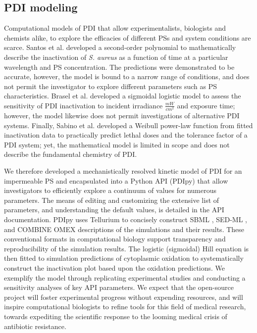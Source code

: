 \subsection{PDI modeling}
Computational models of PDI that allow experimentalists, biologists and chemists alike, to explore the efficacies of different PSs and system conditions are scarce. Santos et al. \cite{Santos2020ApplicationAureus} developed a second-order polynomial to mathematically describe the inactivation of \textit{S. aureus} as a function of time at a particular wavelength and PS concentration. The predictions were demonstrated to be accurate, however, the model is bound to a narrow range of conditions, and does not permit the investigator to explore different parameters such as PS characteristics. Brasel et al. \cite{Brasel2020AnAgalactiae} developed a sigmoidal logistic model to assess the sensitivity of PDI inactivation to incident irradiance $\frac{mW}{cm^2}$ and exposure time; however, the model likewise does not permit investigations of alternative PDI systems. Finally, Sabino et al. \cite{Sabino2019InactivationTherapy} developed a Weibull power-law function from fitted inactivation data to practically predict lethal doses and the tolerance factor of a PDI system; yet, the mathematical model is limited in scope and does not describe the fundamental chemistry of PDI. 

We therefore developed a mechanistically resolved kinetic model of PDI for an impermeable PS and encapsulated into a Python API (PDIpy) that allow investigators to efficiently explore a continuum of values for numerous parameters. The means of editing and customizing the extensive list of parameters, and understanding the default values, is detailed in the API documentation. PDIpy uses Tellurium \cite{Choi2018Tellurium:Biology} to concisely construct SBML \cite{Keating2020Models}, SED-ML \cite{Waltemath2011ReproducibleLanguage}, and COMBINE OMEX \cite{Bergmann2014COMBINEProject} descriptions of the simulations and their results. These conventional formats in computational biology support transparency and reproducibility of the simulation results. The logistic (sigmoidal) Hill equation is then fitted to simulation predictions of cytoplasmic oxidation to systematically construct the inactivation plot based upon the oxidation predictions. We exemplify the model through replicating experimental studies and conducting a sensitivity analyses of key API parameters. We expect that the open-source project will foster experimental progress without expending resources, and will inspire computational biologists to refine tools for this field of medical research, towards expediting the scientific response to the looming medical crisis of antibiotic resistance. 

